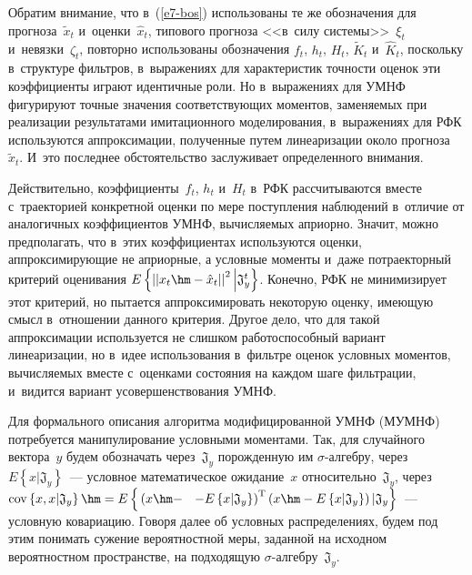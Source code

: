 \begin{multicols}{2}
    Обратим внимание, что в~(\ref{e7-bos}) использованы те же обозначения 
для прогноза~$\tilde{x}_t$ и~оценки~$\hat{x}_t$, типового прогноза <<в~силу 
системы>>~$\xi_t$ и~невязки~$\zeta_t$, повторно использованы обозначения 
$f_t$, $h_t$, $H_t$, $\tilde{K}_t$ и~$\hat{K}_t$, поскольку в~структуре 
фильтров, в~выражениях для характеристик точности оценок эти коэффициенты 
играют идентичные роли. Но в~выражениях для УМНФ фигурируют точные 
значения соответствующих моментов, заменяемых при реализации 
результатами имитационного моделирования, в~выражениях для РФК 
используются аппроксимации, полученные путем линеаризации около 
прогноза~$\tilde{x}_t$. И~это последнее обстоятельство заслуживает 
определенного внимания.
    
    Действительно, коэффициенты~$f_t$, $h_t$ и~$H_t$ в~РФК рассчитываются 
вместе с~траекторией конкретной оценки по мере поступления наблюдений 
в~отличие от аналогичных коэффициентов УМНФ, вы\-чис\-ля\-емых априорно. 
Значит, можно предполагать, что в~этих коэффициентах используются оценки, 
аппроксимирующие не априорные, а условные моменты и~даже потраекторный 
критерий оценивания $E\left\{ \left\vert \left\vert x_t \hm-
\hat{x}_t\right\vert\right\vert^2\Big\vert \mathfrak{J}_y^t\right\}$. Конечно, РФК 
не минимизирует этот критерий, но пытается аппроксимировать некоторую 
оценку, имеющую смысл в~отношении данного критерия. Другое дело, что для 
такой аппроксимации используется не слишком работоспособный вариант 
линеаризации, но в~идее использования в~фильтре оценок условных моментов, 
вычисляемых вместе с~оценками состояния на каждом шаге фильтрации, 
и~видится вариант усовершенствования УМНФ.
    
    Для формального описания алгоритма модифицированной УМНФ 
(МУМНФ) потребуется манипулирование условными моментами. Так, для 
случайного вектора~$y$   будем обозначать через~$\mathfrak{J}_y$ порожденную 
им $\sigma$-ал\-геб\-ру, через $E\left\{ x\vert \mathfrak{J}_y\right\}$~--- 
условное математическое ожидание~$x$ относительно~$\mathfrak{J}_y$, через 
$\mathrm{cov}\left \{ x, x\vert \mathfrak{J}_y\right\}\hm=
E\left\{ 
\vphantom{\left(\left\{ x\vert \mathfrak{J}\right\}\right)^{\mathrm{T}}}
\left( x\hm-\right.\right.$\linebreak
$\left.\left.-E\left\{ x\vert \mathfrak{J}_y\right\}\right)^{\mathrm{T}}\left(
x\hm- E\left\{ x\vert \mathfrak{J}_y\right\} \right)\vert \mathfrak{J}_y\right\}$~--- условную ковариацию. Говоря далее об 
условных распределениях, будем под этим понимать сужение вероятностной 
меры, заданной на исходном вероятностном пространстве, на подходящую 
$\sigma$-ал\-геб\-ру~$\mathfrak{J}_y$.
    

\end{multicols}
